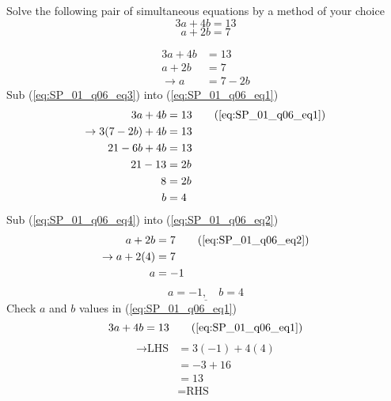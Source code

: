\question Solve the following pair of simultaneous equations by a method of 
your choice
\[
	3a + 4b = 13
\]
\[
	a + 2b = 7
\]
\begin{solution}
	\begin{align}
		3a + 4b 		
			&= 13 
			\label{eq:SP_01_q06_eq1} \\
		a + 2b			
			&= 7 
			\label{eq:SP_01_q06_eq2} \\
		\rightarrow a 	
			&= 7-2b
			\label{eq:SP_01_q06_eq3}
	\end{align}
	Sub (\ref{eq:SP_01_q06_eq3}) into (\ref{eq:SP_01_q06_eq1})
	\noindent
	\begin{align}
		3a + 4b 
			&= 13 
			\nonumber \tag{\ref{eq:SP_01_q06_eq1}}
			\\
		\rightarrow 
		3(7-2b) + 4b 
			&= 13 
			\nonumber
			\\
		21 - 6b + 4b 
			&= 13 
			\nonumber
			\\
		21 - 13 
			&= 2b
			\nonumber
			\\
		8
			&= 2b
			\nonumber
			\\
		b
			&= 4 
			\label{eq:SP_01_q06_eq4}
	\end{align}
	Sub (\ref{eq:SP_01_q06_eq4}) into (\ref{eq:SP_01_q06_eq2})
	\begin{align*}
		a + 2b			
			&= 7 
			\tag{\ref{eq:SP_01_q06_eq2}} \\
		\rightarrow
		a + 2(4) 
			&= 7
			\\
		a 
			&= -1
	\end{align*}
	\[ 
		\underline{
			a = -1, \quad b = 4
		}
	\]
	Check $a$ and $b$ values in (\ref{eq:SP_01_q06_eq1})
	\[
		3a + 4b = 13 
		\tag{\ref{eq:SP_01_q06_eq1}}
	\]
	\begin{align*}
		\rightarrow 
		\text{LHS} 
			&= 3(-1) + 4(4)
			\\
			&= -3 + 16
			\\
			&= 13
			\\
			&= \text{RHS}
	\end{align*}
\end{solution}

